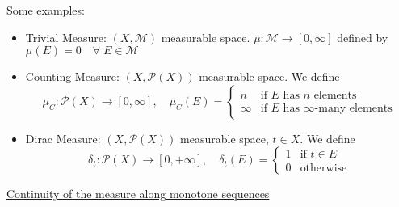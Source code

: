 \documentclass[a4paper,12pt]{article}
\theoremstyle{break}
\numberwithin{equation}{section}
\begin{document}
    Some examples:
    \begin{itemize}
        \item Trivial Measure: \((X, \mathcal{M})\) measurable space. \(\mu : \mathcal{M} \to [0, \infty]\) defined by \(\mu(E) = 0 \quad \forall \; E \in \mathcal{M}\) 
        \item Counting Measure: \((X, \mathcal{P}(X))\) measurable space. We define 
        \[
            \mu_C :  \mathcal{P}(X) \to [0, \infty], \quad \mu_C (E) = \begin{cases}
                n & \mbox{if } E \mbox{ has } n \mbox{ elements} \\
                \infty &  \mbox{if } E \mbox{ has } \infty \mbox{-many elements} 
            \end{cases}
        \]
        \item Dirac Measure: \((X, \mathcal{P}(X))\) measurable space, \(t \in X\). We define 
        \[
            \delta_t  :  \mathcal{P}(X) \to [0, +\infty], \quad \delta_t(E) = \begin{cases}
                1 & \mbox{if } t \in E\\
                0 & \mbox{otherwise}
            \end{cases}
        \]
    \end{itemize}
\underline{Continuity of the measure along monotone sequences}
\end{document}
